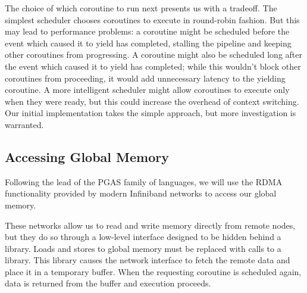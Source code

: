 \documentclass{acm_proc_article-sp}
\begin{document}
The choice of which coroutine to run next presents us with a
tradeoff. The simplest scheduler chooses coroutines to execute in
round-robin fashion. But this may lead to performance problems: a
coroutine might be scheduled before the event which caused it to yield
has completed, stalling the pipeline and keeping other coroutines from
progressing. A coroutine might also be scheduled long after the event
which caused it to yield has completed; while this wouldn't block
other coroutines from proceeding, it would add unnecessary latency to
the yielding coroutine. A more intelligent scheduler might allow
coroutines to execute only when they were ready, but this could
increase the overhead of context switching. Our initial implementation
takes the simple approach, but more investigation is warranted.

\subsection{Accessing Global Memory}







Following the lead of the PGAS family of languages, we will use
the RDMA functionality provided by modern Infiniband networks to
access our global memory. 

These networks allow us to read and write memory directly from remote
nodes, but they do so through a low-level interface designed to be
hidden behind a library. Loads and stores to global memory must be
replaced with calls to a library. This library causes the network
interface to fetch the remote data and place it in a temporary
buffer. When the requesting coroutine is scheduled again, data is
returned from the buffer and execution proceeds.
\end{document}
